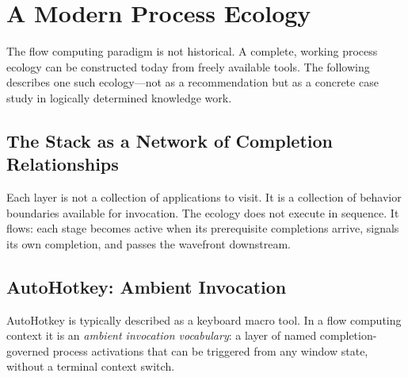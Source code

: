 \documentclass[12pt, a4paper]{article}
\begin{document}
\section{A Modern Process Ecology}

The flow computing paradigm is not historical. A complete, working
process ecology can be constructed today from freely available tools.
The following describes one such ecology---not as a recommendation
but as a concrete case study in logically determined knowledge work.

\subsection{The Stack as a Network of Completion Relationships}

\begin{center}
\end{center}

Each layer is not a collection of applications to visit. It is a
collection of behavior boundaries available for invocation. The ecology
does not execute in sequence. It flows: each stage becomes active when
its prerequisite completions arrive, signals its own completion, and
passes the wavefront downstream.

\subsection{AutoHotkey: Ambient Invocation}

AutoHotkey is typically described as a keyboard macro tool. In a flow
computing context it is an \emph{ambient invocation vocabulary}: a
layer of named completion-governed process activations that can be
triggered from any window state, without a terminal context switch.
\end{document}
